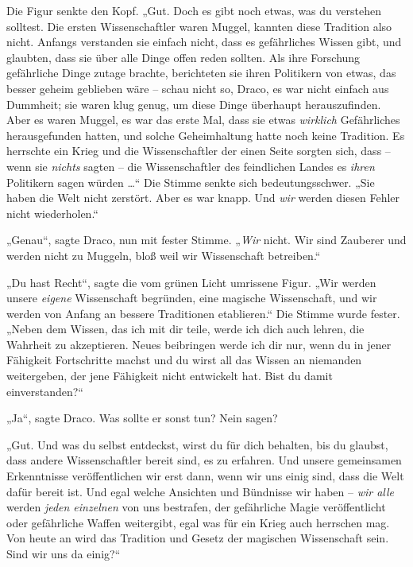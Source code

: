 Die Figur senkte den Kopf. „Gut. Doch es gibt noch etwas, was du verstehen solltest. Die ersten Wissenschaftler waren Muggel, kannten diese Tradition also nicht. Anfangs verstanden sie einfach nicht, dass es gefährliches Wissen gibt, und glaubten, dass sie über alle Dinge offen reden sollten. Als ihre Forschung gefährliche Dinge zutage brachte, berichteten sie ihren Politikern von etwas, das besser geheim geblieben wäre – schau nicht so, Draco, es war nicht einfach aus Dummheit; sie waren klug genug, um diese Dinge überhaupt herauszufinden. Aber es waren Muggel, es war das erste Mal, dass sie etwas \emph{wirklich} Gefährliches herausgefunden hatten, und solche Geheimhaltung hatte noch keine Tradition. Es herrschte ein Krieg und die Wissenschaftler der einen Seite sorgten sich, dass – wenn sie \emph{nichts} sagten – die Wissenschaftler des feindlichen Landes es \emph{ihren} Politikern sagen würden …“ Die Stimme senkte sich bedeutungsschwer. „Sie haben die Welt nicht zerstört. Aber es war knapp. Und \emph{wir} werden diesen Fehler nicht wiederholen.“ 

„Genau“, sagte Draco, nun mit fester Stimme. „\emph{Wir} nicht. Wir sind Zauberer und werden nicht zu Muggeln, bloß weil wir Wissenschaft betreiben.“ 

„Du hast Recht“, sagte die vom grünen Licht umrissene Figur. „Wir werden unsere \emph{eigene} Wissenschaft begründen, eine magische Wissenschaft, und wir werden von Anfang an bessere Traditionen etablieren.“ Die Stimme wurde fester. „Neben dem Wissen, das ich mit dir teile, werde ich dich auch lehren, die Wahrheit zu akzeptieren. Neues beibringen werde ich dir nur, wenn du in jener Fähigkeit Fortschritte machst und du wirst all das Wissen an niemanden weitergeben, der jene Fähigkeit nicht entwickelt hat. Bist du damit einverstanden?“ 

„Ja“, sagte Draco. Was sollte er sonst tun? Nein sagen? 

„Gut. Und was du selbst entdeckst, wirst du für dich behalten, bis du glaubst, dass andere Wissenschaftler bereit sind, es zu erfahren. Und unsere gemeinsamen Erkenntnisse veröffentlichen wir erst dann, wenn wir uns einig sind, dass die Welt dafür bereit ist. Und egal welche Ansichten und Bündnisse wir haben – \emph{wir alle} werden \emph{jeden einzelnen} von uns bestrafen, der gefährliche Magie veröffentlicht oder gefährliche Waffen weitergibt, egal was für ein Krieg auch herrschen mag. Von heute an wird das Tradition und Gesetz der magischen Wissenschaft sein. Sind wir uns da einig?“ 

